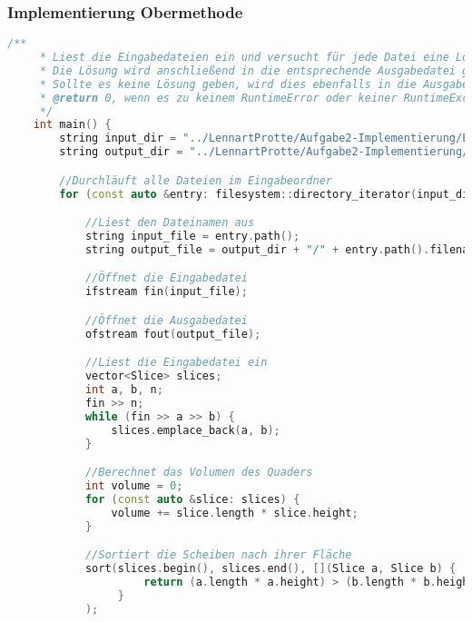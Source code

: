 \documentclass[a4paper,10pt,ngerman]{scrartcl}
\begin{document}
    \subsubsection{Implementierung Obermethode}
    \begin{lstlisting}[frame=single,language=C++,title=Methode main,breaklines=true,label={lst:code_main_extended}]
    /**
     * Liest die Eingabedateien ein und versucht für jede Datei eine Lösung entsprechend der Aufgabenstellung zu finden
     * Die Lösung wird anschließend in die entsprechende Ausgabedatei geschrieben
     * Sollte es keine Lösung geben, wird dies ebenfalls in die Ausgabedatei geschrieben
     * @return 0, wenn es zu keinem RuntimeError oder keiner RuntimeException gekommen ist
     */
    int main() {
        string input_dir = "../LennartProtte/Aufgabe2-Implementierung/Eingabedateien_b";
        string output_dir = "../LennartProtte/Aufgabe2-Implementierung/Ausgabedateien_b";

        //Durchläuft alle Dateien im Eingabeordner
        for (const auto &entry: filesystem::directory_iterator(input_dir)) {

            //Liest den Dateinamen aus
            string input_file = entry.path();
            string output_file = output_dir + "/" + entry.path().filename().string();

            //Öffnet die Eingabedatei
            ifstream fin(input_file);

            //Öffnet die Ausgabedatei
            ofstream fout(output_file);

            //Liest die Eingabedatei ein
            vector<Slice> slices;
            int a, b, n;
            fin >> n;
            while (fin >> a >> b) {
                slices.emplace_back(a, b);
            }

            //Berechnet das Volumen des Quaders
            int volume = 0;
            for (const auto &slice: slices) {
                volume += slice.length * slice.height;
            }

            //Sortiert die Scheiben nach ihrer Fläche
            sort(slices.begin(), slices.end(), [](Slice a, Slice b) {
                     return (a.length * a.height) > (b.length * b.height);
                 }
            );


\end{lstlisting}
\end{document}
